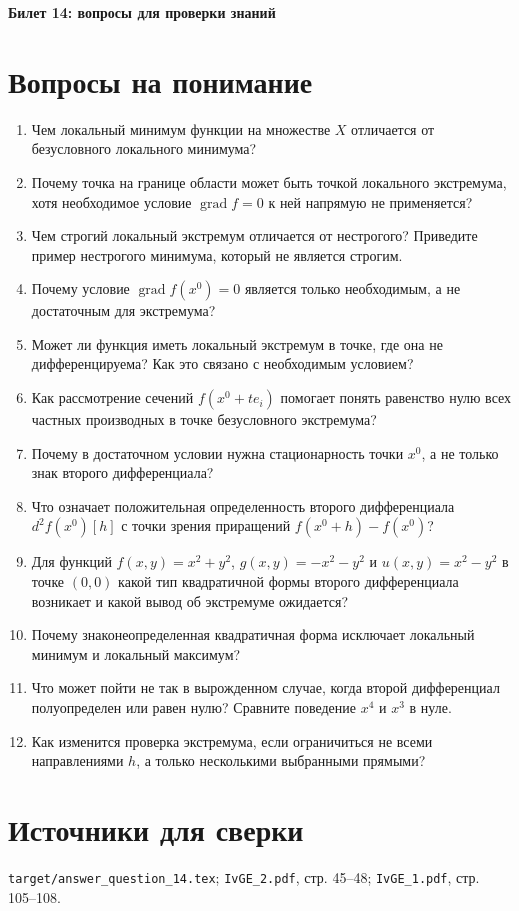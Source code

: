 \documentclass[12pt,a4paper]{article}
\begin{document}
\begin{center}
{\Large\bfseries Билет 14: вопросы для проверки знаний}
\end{center}

\noindent{}

\section*{Вопросы на понимание}

\begin{enumerate}
\item Чем локальный минимум функции на множестве \(X\) отличается от безусловного локального минимума?
\item Почему точка на границе области может быть точкой локального экстремума, хотя необходимое условие \(\operatorname{grad} f=0\) к ней напрямую не применяется?
\item Чем строгий локальный экстремум отличается от нестрогого? Приведите пример нестрогого минимума, который не является строгим.
\item Почему условие \(\operatorname{grad} f(x^0)=0\) является только необходимым, а не достаточным для экстремума?
\item Может ли функция иметь локальный экстремум в точке, где она не дифференцируема? Как это связано с необходимым условием?
\item Как рассмотрение сечений \(f(x^0+t e_i)\) помогает понять равенство нулю всех частных производных в точке безусловного экстремума?
\item Почему в достаточном условии нужна стационарность точки \(x^0\), а не только знак второго дифференциала?
\item Что означает положительная определенность второго дифференциала \(d^2f(x^0)[h]\) с точки зрения приращений \(f(x^0+h)-f(x^0)\)?
\item Для функций \(f(x,y)=x^2+y^2\), \(g(x,y)=-x^2-y^2\) и \(u(x,y)=x^2-y^2\) в точке \((0,0)\) какой тип квадратичной формы второго дифференциала возникает и какой вывод об экстремуме ожидается?
\item Почему знаконеопределенная квадратичная форма исключает локальный минимум и локальный максимум?
\item Что может пойти не так в вырожденном случае, когда второй дифференциал полуопределен или равен нулю? Сравните поведение \(x^4\) и \(x^3\) в нуле.
\item Как изменится проверка экстремума, если ограничиться не всеми направлениями \(h\), а только несколькими выбранными прямыми?
\end{enumerate}

\section*{Источники для сверки}

\texttt{target/answer\_question\_14.tex};
\texttt{IvGE\_2.pdf}, стр. 45--48;
\texttt{IvGE\_1.pdf}, стр. 105--108.
\end{document}
